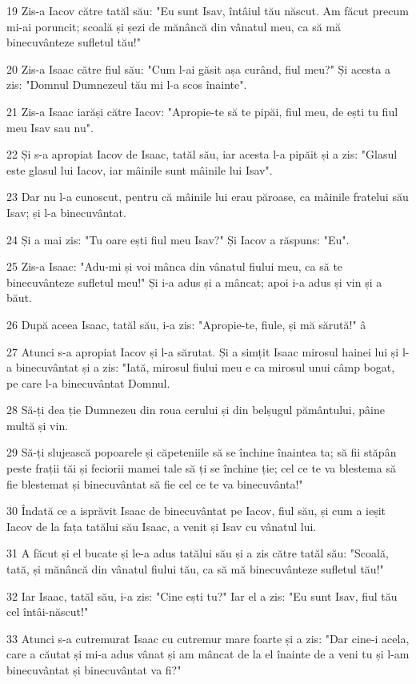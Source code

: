 \par 19 Zis-a Iacov către tatăl său: "Eu sunt Isav, întâiul tău născut. Am făcut precum mi-ai poruncit; scoală și șezi de mănâncă din vânatul meu, ca să mă binecuvânteze sufletul tău!"
\par 20 Zis-a Isaac către fiul său: "Cum l-ai găsit așa curând, fiul meu?" Și acesta a zis: "Domnul Dumnezeul tău mi l-a scos înainte".
\par 21 Zis-a Isaac iarăși către Iacov: "Apropie-te să te pipăi, fiul meu, de ești tu fiul meu Isav sau nu".
\par 22 Și s-a apropiat Iacov de Isaac, tatăl său, iar acesta l-a pipăit și a zis: "Glasul este glasul lui Iacov, iar mâinile sunt mâinile lui Isav".
\par 23 Dar nu l-a cunoscut, pentru că mâinile lui erau păroase, ca mâinile fratelui său Isav; și l-a binecuvântat.
\par 24 Și a mai zis: "Tu oare ești fiul meu Isav?" Și Iacov a răspuns: "Eu".
\par 25 Zis-a Isaac: "Adu-mi și voi mânca din vânatul fiului meu, ca să te binecuvânteze sufletul meu!" Și i-a adus și a mâncat; apoi i-a adus și vin și a băut.
\par 26 După aceea Isaac, tatăl său, i-a zis: "Apropie-te, fiule, și mă sărută!" â
\par 27 Atunci s-a apropiat Iacov și l-a sărutat. Și a simțit Isaac mirosul hainei lui și l-a binecuvântat și a zis: "Iată, mirosul fiului meu e ca mirosul unui câmp bogat, pe care l-a binecuvântat Domnul.
\par 28 Să-ți dea ție Dumnezeu din roua cerului și din belșugul pământului, pâine multă și vin.
\par 29 Să-ți slujească popoarele și căpeteniile să se închine înaintea ta; să fii stăpân peste frații tăi și feciorii mamei tale să ți se închine ție; cel ce te va blestema să fie blestemat și binecuvântat să fie cel ce te va binecuvânta!"
\par 30 Îndată ce a isprăvit Isaac de binecuvântat pe Iacov, fiul său, și cum a ieșit Iacov de la fața tatălui său Isaac, a venit și Isav cu vânatul lui.
\par 31 A făcut și el bucate și le-a adus tatălui său și a zis către tatăl său: "Scoală, tată, și mănâncă din vânatul fiului tău, ca să mă binecuvânteze sufletul tău!"
\par 32 Iar Isaac, tatăl său, i-a zis: "Cine ești tu?" Iar el a zis: "Eu sunt Isav, fiul tău cel întâi-născut!"
\par 33 Atunci s-a cutremurat Isaac cu cutremur mare foarte și a zis: "Dar cine-i acela, care a căutat și mi-a adus vânat și am mâncat de la el înainte de a veni tu și l-am binecuvântat și binecuvântat va fi?"

